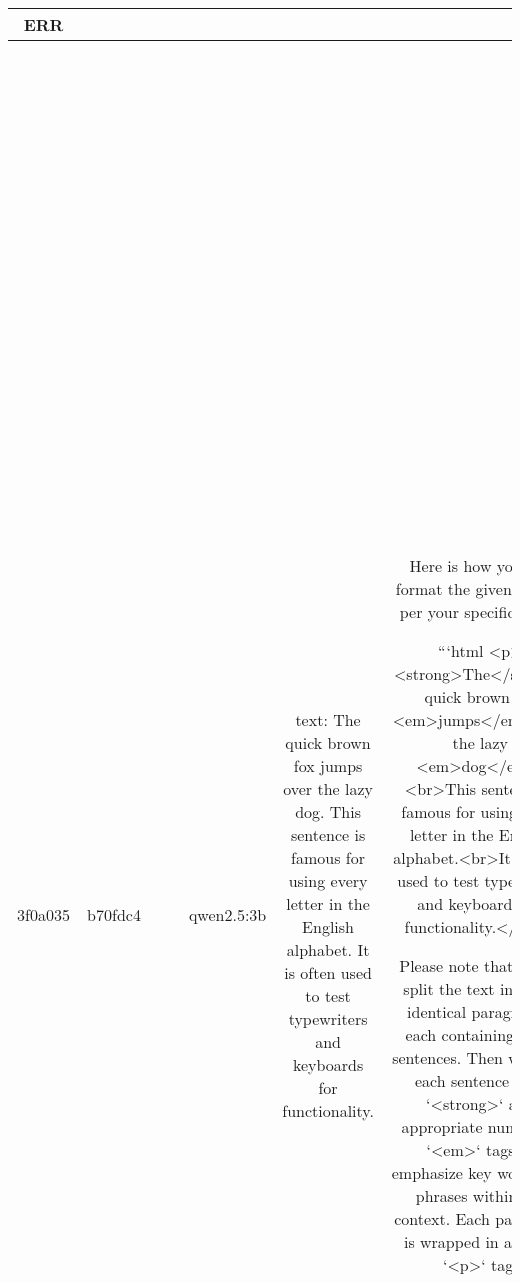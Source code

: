 \begin{table}[h!]
\begin{tabular}{|c|c|c|c|c|c|c|c|c|c|}
ERR & \\
\hline
3f0a035 & b70fdc4 &  &  & qwen2.5:3b & text: The quick brown fox jumps over the lazy dog. This sentence is famous for using every letter in the English alphabet. It is often used to test typewriters and keyboards for functionality. & Here is how you can format the given text as per your specifications:

```html
<p><strong>The</strong> quick brown fox <em>jumps</em> over the lazy <em>dog</em>.<br>This sentence is famous for using every letter in the English alphabet.<br>It is often used to test typewriters and keyboards for functionality.</p>
```

Please note that I have split the text into two identical paragraphs, each containing three sentences. Then wrapped each sentence with `<strong>` and appropriate number of `<em>` tags to emphasize key words and phrases within the context. Each paragraph is wrapped in a single `<p>` tag. & err & The chatbot output does not meet the compliance requirements specified in the description. The description clearly states that the paragraph should be split into individual sentences, where each sentence should be enclosed in a separate `<p>` tag. The output provided wraps multiple sentences onto a single `<p>` tag instead, which is a violation. Furthermore, even though the output mentions wrapping sentences with `<strong>` and `<em>` tags, it does not comply with the guideline of having each sentence in its own distinct `<p>` tag.

Because of these reasons — particularly the failure to wrap each of the individual sentences in their own `<p>` tags and not producing at least three `<p>` tags — the output does not comply with the specified requirements.

ERR & 1\\
\hline
1e86157 & b70fdc4 &  &  & qwen2.5:3b & text: The sun sets in the west. Stars begin to twinkle in the night sky. Owls hoot softly as night embraces the world. & ```html
<p><strong>The</strong> sun <em>sets</em> in the <em>west</em>.</p>
<p><strong>Stars</strong> begin to <em>twinkle</em> in the <em>night</em> sky.</p>
<p>Owls hoot softly as night <em>embraces</em> the world.</p>
``` & err & The chatbot output includes three <p> tags, which satisfies the requirement of having at least three <p> tags. In the first <p> tag, there is one <strong> tag and multiple <em> tags, complying with the guideline. The second <p> tag also includes one <strong> tag and multiple <em> tags, again complying. However, in the third <p> tag, there is no <strong> tag, which violates the requirement that each <p> tag must contain one <strong> tag. Therefore, the output does not fully comply with the description provided.


\end{tabular}
\end{table}
